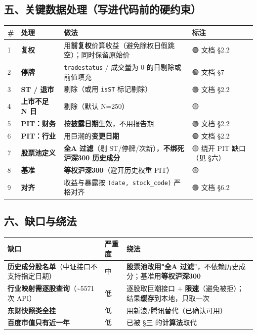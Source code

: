\documentclass[11pt]{article}
\begin{document}
\subsection{\texorpdfstring{五、关键数据处理（写进代码前的硬约束）}{五、关键数据处理（写进代码前的硬约束）}}
{\small
\begin{longtable}{p{1.26cm}p{2.49cm}p{8.64cm}p{3.81cm}}
\toprule
\# & 处理 & 做法 & 标注 \\
\midrule
1 & \textbf{复权} & 用\textbf{前复权}价算收益（避免除权日假跳空）；同时保留原始价 & 🟢 文档 \S{}2.2 \\
2 & \textbf{停牌} & \texttt{tradestatus} / 成交量为 0 的日剔除或前值填充 & 🟢 文档 \S{}7 \\
3 & \textbf{ST / 退市} & 剔除（或用 \texttt{isST} 标记剔除） & 🟢 文档 \S{}2.2 \\
4 & \textbf{上市不足 N 日} & 剔除（默认 N=250） & 🟡 \\
5 & \textbf{PIT：财务} & 按\textbf{披露日期}生效，不用报告期 & 🟢 文档 \S{}2.2 \\
6 & \textbf{PIT：行业} & 用巨潮的\textbf{变更日期} & 🟢 文档 \S{}2.2 \\
7 & \textbf{股票池定义} & \textbf{全A 过滤}（剔 ST/停牌/次新），\textbf{不绑死沪深300 历史成分} & 🟡 绕开 PIT 缺口（见 \S{}六） \\
8 & \textbf{基准} & \textbf{等权沪深300}（避开历史权重 PIT） & 🟡 \\
9 & \textbf{对齐} & 收益与暴露按 \texttt{(date, stock\_code)} 严格对齐 & 🟢 文档 \S{}6.2 \\
\bottomrule
\end{longtable}
}
\subsection{\texorpdfstring{六、缺口与绕法}{六、缺口与绕法}}
{\small
\begin{longtable}{p{5.92cm}p{1.26cm}p{9.02cm}}
\toprule
缺口 & 严重度 & 绕法 \\
\midrule
\textbf{历史成分股名单}（中证接口不支持指定日期） & 中 & \textbf{股票池改用"全A 过滤"}，不依赖历史成分；基准用\textbf{等权沪深300} \\
\textbf{行业映射需逐股查询}（\textasciitilde{}5571 次 API） & 低 & 逐股取巨潮接口 + \textbf{限速}（避免被拒）；结果\textbf{缓存}到本地，只取一次 \\
\textbf{东财快照类全挂} & 低 & 用新浪/腾讯替代（已确认可用） \\
\textbf{百度市值只有近一年} & 低 & 已被 \S{}三 的\textbf{计算法}取代 \\
\bottomrule
\end{longtable}
}
\end{document}
